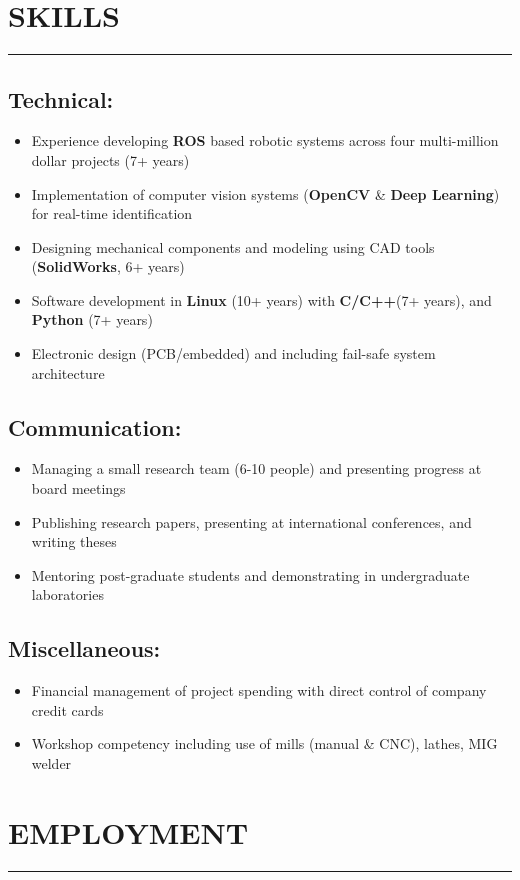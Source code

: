 \documentclass[english]{extarticle}
\newcommand{\mySect}[2]{
    \section*{\textcolor{secondary}{#1}\hfill{\footnotesize\textmd{{#2}}}}
    \vspace{-2em}
    \textcolor{tertiary}{\hrule}
    \vspace{0.5em}
}
\begin{document}
\mySect{SKILLS}{}

\subsection*{Technical:}
\begin{itemize}
    \item {Experience developing \textbf{ROS} based robotic systems across four multi-million dollar projects (7+ years)}
    \item {Implementation of computer vision systems (\textbf{OpenCV} \& \textbf{Deep Learning}) for real-time identification}
    \item {Designing mechanical components and modeling using CAD tools (\textbf{SolidWorks}, 6+ years)}
    \item {Software development in \textbf{Linux} (10+ years) with \textbf{C/C++}(7+ years), and \textbf{Python} (7+ years)}
    \item {Electronic design (PCB/embedded) and including fail-safe system architecture}
\end{itemize}

\subsection*{Communication:}
\begin{itemize}
    \item {Managing a small research team (6-10 people) and presenting progress at board meetings}
    \item {Publishing research papers, presenting at international conferences, and writing theses}
    \item {Mentoring post-graduate students and demonstrating in undergraduate laboratories}
\end{itemize}

\subsection*{Miscellaneous:}
\begin{itemize}
    \item {Financial management of project spending with direct control of company credit cards}
    \item {Workshop competency including use of mills (manual \& CNC), lathes, MIG welder}
\end{itemize}
\mySect{EMPLOYMENT}{}
\end{document}
